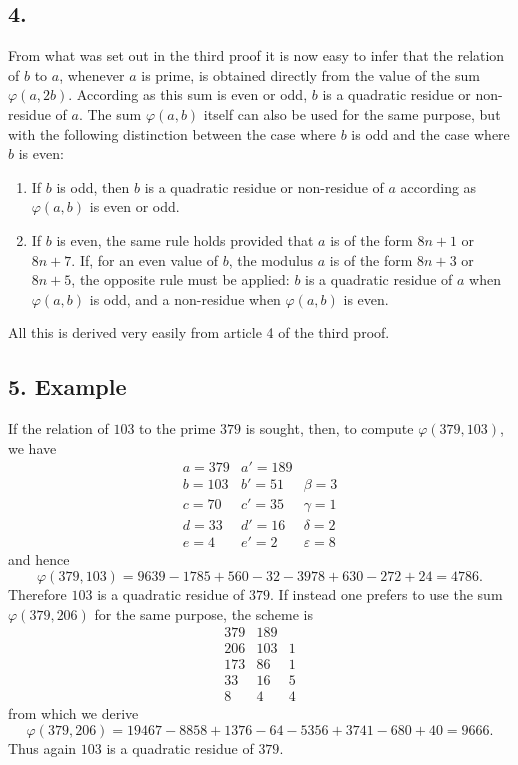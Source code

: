 \documentclass[12pt]{article}
\begin{document}
\subsection*{4.}

From what was set out in the third proof it is now easy to infer that the relation of $b$ to $a$, whenever $a$ is prime, is obtained directly from the value of the sum $\varphi(a,2b)$. According as this sum is even or odd, $b$ is a quadratic residue or non-residue of $a$. The sum $\varphi(a,b)$ itself can also be used for the same purpose, but with the following distinction between the case where $b$ is odd and the case where $b$ is even:
\begin{enumerate}[label=\Roman*.]
\item If $b$ is odd, then $b$ is a quadratic residue or non-residue of $a$ according as $\varphi(a,b)$ is even or odd.
\item If $b$ is even, the same rule holds provided that $a$ is of the form $8n+1$ or $8n+7$. If, for an even value of $b$, the modulus $a$ is of the form $8n+3$ or $8n+5$, the opposite rule must be applied: $b$ is a quadratic residue of $a$ when $\varphi(a,b)$ is odd, and a non-residue when $\varphi(a,b)$ is even.
\end{enumerate}
All this is derived very easily from article 4 of the third proof.

\subsection*{5. Example}

If the relation of $103$ to the prime $379$ is sought, then, to compute $\varphi(379,103)$, we have
\[
\begin{array}{r|r|r}
a=379&a'=189&\\
b=103&b'=51&\beta=3\\
c=70&c'=35&\gamma=1\\
d=33&d'=16&\delta=2\\
e=4&e'=2&\varepsilon=8
\end{array}
\]
and hence
\[
\varphi(379,103)=9639-1785+560-32-3978+630-272+24=4786.
\]
Therefore $103$ is a quadratic residue of $379$. If instead one prefers to use the sum $\varphi(379,206)$ for the same purpose, the scheme is
\[
\begin{array}{r|r|r}
379&189&\\
206&103&1\\
173&86&1\\
33&16&5\\
8&4&4
\end{array}
\]
from which we derive
\[
\varphi(379,206)=19467-8858+1376-64-5356+3741-680+40=9666.
\]
Thus again $103$ is a quadratic residue of $379$.
\end{document}
